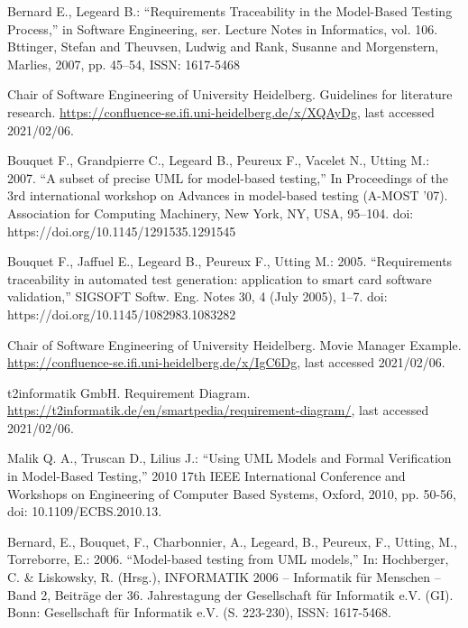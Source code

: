 \documentclass[a4paper,10pt, bibliography=totocnumbered]{scrreprt}
\begin{document}
\begin{thebibliography}{9}
 Bernard E., Legeard B.: \enquote{Requirements Traceability in the Model-Based Testing Process,}  in Software Engineering, ser. Lecture Notes in Informatics, vol. 106. Bttinger, Stefan and Theuvsen, Ludwig and Rank, Susanne and Morgenstern, Marlies, 2007, pp. 45–54, ISSN: 1617-5468

 Chair of Software Engineering of University Heidelberg. Guidelines for literature research.
\url{https://confluence-se.ifi.uni-heidelberg.de/x/XQAyDg}, last accessed 2021/02/06. 

 Bouquet F., Grandpierre C., Legeard B., Peureux F., Vacelet N., Utting M.: 2007. \enquote{A subset of precise UML for model-based testing,} In Proceedings of the 3rd international workshop on Advances in model-based testing (A-MOST '07). Association for Computing Machinery, New York, NY, USA, 95–104. doi: https://doi.org/10.1145/1291535.1291545

 Bouquet F., Jaffuel E., Legeard B., Peureux F., Utting M.: 2005. \enquote{Requirements traceability in automated test generation: application to smart card software validation,} SIGSOFT Softw. Eng. Notes 30, 4 (July 2005), 1–7. doi: https://doi.org/10.1145/1082983.1083282

 Chair of Software Engineering of University Heidelberg. Movie Manager Example. 
\url{https://confluence-se.ifi.uni-heidelberg.de/x/IgC6Dg}, last accessed 2021/02/06. 

 t2informatik GmbH. Requirement Diagram.
\url{https://t2informatik.de/en/smartpedia/requirement-diagram/}, last accessed 2021/02/06. 

 Malik Q. A., Truscan D., Lilius J.: \enquote{Using UML Models and Formal Verification in Model-Based Testing,} 2010 17th IEEE International Conference and Workshops on Engineering of Computer Based Systems, Oxford, 2010, pp. 50-56, doi: 10.1109/ECBS.2010.13.

 Bernard, E., Bouquet, F., Charbonnier, A., Legeard, B., Peureux, F., Utting, M., Torreborre, E.: 2006. \enquote{Model-based testing from UML models,} In: Hochberger, C. \& Liskowsky, R. (Hrsg.), INFORMATIK 2006 – Informatik für Menschen – Band 2, Beiträge der 36. Jahrestagung der Gesellschaft für Informatik e.V. (GI). Bonn: Gesellschaft für Informatik e.V. (S. 223-230),  ISSN: 1617-5468.





\end{thebibliography}
\end{document}
